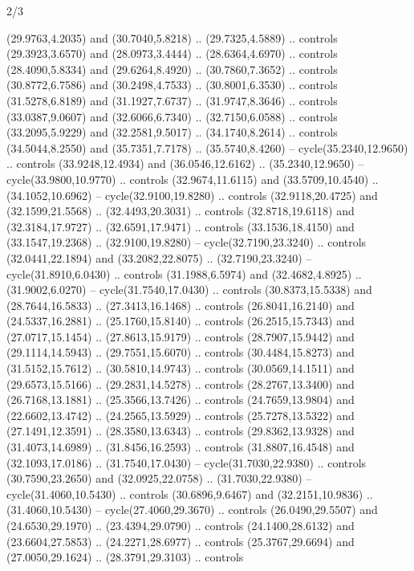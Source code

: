 \begin{flagdescription}{2/3}
\begin{scope}[yshift=\flagwidth,scale=\flagwidth/1241.93737]
\begin{scope}[y=-1mm, x=1mm,draw=gold,fill=blue,line join=miter,miter limit=4,line width=1.8\lw]
\begin{scope}[y=1mm, x=1mm, yscale=-1,shift={(573.68mm+\str,145.75)}]
\begin{scope}[scale=1.35,shift={(-9,-3)}]
\begin{scope}[scale=0.55]
\begin{scope}[scale=1.333]
    (29.9763,4.2035) and (30.7040,5.8218) .. (29.7325,4.5889) .. controls
    (29.3923,3.6570) and (28.0973,3.4444) .. (28.6364,4.6970) .. controls
    (28.4090,5.8334) and (29.6264,8.4920) .. (30.7860,7.3652) .. controls
    (30.8772,6.7586) and (30.2498,4.7533) .. (30.8001,6.3530) .. controls
    (31.5278,6.8189) and (31.1927,7.6737) .. (31.9747,8.3646) .. controls
    (33.0387,9.0607) and (32.6066,6.7340) .. (32.7150,6.0588) .. controls
    (33.2095,5.9229) and (32.2581,9.5017) .. (34.1740,8.2614) .. controls
    (34.5044,8.2550) and (35.7351,7.7178) .. (35.5740,8.4260) --
    cycle(35.2340,12.9650) .. controls (33.9248,12.4934) and (36.0546,12.6162) ..
    (35.2340,12.9650) -- cycle(33.9800,10.9770) .. controls (32.9674,11.6115) and
    (33.5709,10.4540) .. (34.1052,10.6962) -- cycle(32.9100,19.8280) .. controls
    (32.9118,20.4725) and (32.1599,21.5568) .. (32.4493,20.3031) .. controls
    (32.8718,19.6118) and (32.3184,17.9727) .. (32.6591,17.9471) .. controls
    (33.1536,18.4150) and (33.1547,19.2368) .. (32.9100,19.8280) --
    cycle(32.7190,23.3240) .. controls (32.0441,22.1894) and (33.2082,22.8075) ..
    (32.7190,23.3240) -- cycle(31.8910,6.0430) .. controls (31.1988,6.5974) and
    (32.4682,4.8925) .. (31.9002,6.0270) -- cycle(31.7540,17.0430) .. controls
    (30.8373,15.5338) and (28.7644,16.5833) .. (27.3413,16.1468) .. controls
    (26.8041,16.2140) and (24.5337,16.2881) .. (25.1760,15.8140) .. controls
    (26.2515,15.7343) and (27.0717,15.1454) .. (27.8613,15.9179) .. controls
    (28.7907,15.9442) and (29.1114,14.5943) .. (29.7551,15.6070) .. controls
    (30.4484,15.8273) and (31.5152,15.7612) .. (30.5810,14.9743) .. controls
    (30.0569,14.1511) and (29.6573,15.5166) .. (29.2831,14.5278) .. controls
    (28.2767,13.3400) and (26.7168,13.1881) .. (25.3566,13.7426) .. controls
    (24.7659,13.9804) and (22.6602,13.4742) .. (24.2565,13.5929) .. controls
    (25.7278,13.5322) and (27.1491,12.3591) .. (28.3580,13.6343) .. controls
    (29.8362,13.9328) and (31.4073,14.6989) .. (31.8456,16.2593) .. controls
    (31.8807,16.4548) and (32.1093,17.0186) .. (31.7540,17.0430) --
    cycle(31.7030,22.9380) .. controls (30.7590,23.2650) and (32.0925,22.0758) ..
    (31.7030,22.9380) -- cycle(31.4060,10.5430) .. controls (30.6896,9.6467) and
    (32.2151,10.9836) .. (31.4060,10.5430) -- cycle(27.4060,29.3670) .. controls
    (26.0490,29.5507) and (24.6530,29.1970) .. (23.4394,29.0790) .. controls
    (24.1400,28.6132) and (23.6604,27.5853) .. (24.2271,28.6977) .. controls
    (25.3767,29.6694) and (27.0050,29.1624) .. (28.3791,29.3103) .. controls

\end{scope}
\end{scope}
\end{scope}
\end{scope}
\end{scope}
\end{scope}
\end{flagdescription}
